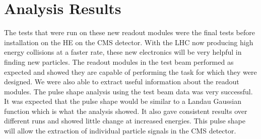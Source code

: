\section{Analysis Results}

The tests that were run on these new readout modules were the final tests before installation on the HE on the CMS detector. With the LHC now producing high energy collisions at a faster rate, these new electronics will be very helpful in finding new particles. The readout modules in the test beam performed as expected and showed they are capable of performing the task for which they were designed. We were also able to extract useful information about the readout modules. The pulse shape analysis using the test beam data was very successful. It was expected that the pulse shape would be similar to a Landau Gaussian function which is what the analysis showed. It also gave consistent results over different runs and showed little change at increased energies. This pulse shape will allow the extraction of individual particle signals in the CMS detector. 

